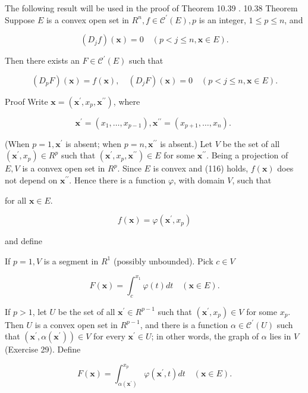 \documentclass[10pt]{article}
\begin{document}
The following result will be used in the proof of Theorem 10.39 . 10.38 Theorem Suppose $E$ is a convex open set in $R^{n}, f \in \mathscr{C}^{\prime}(E), p$ is an integer, $1 \leq p \leq n$, and

$$
\left(D_{j} f\right)(\mathbf{x})=0 \quad(p<j \leq n, \mathbf{x} \in E) .
$$

Then there exists an $F \in \mathscr{C}^{\prime}(E)$ such that

$$
\left(D_{p} F\right)(\mathbf{x})=f(\mathbf{x}), \quad\left(D_{j} F\right)(\mathbf{x})=0 \quad(p<j \leq n, \mathbf{x} \in E) .
$$

Proof Write $\mathbf{x}=\left(\mathbf{x}^{\prime}, x_{p}, \mathbf{x}^{\prime \prime}\right)$, where

$$
\mathbf{x}^{\prime}=\left(x_{1}, \ldots, x_{p-1}\right), \mathbf{x}^{\prime \prime}=\left(x_{p+1}, \ldots, x_{n}\right) \text {. }
$$

(When $p=1, \mathbf{x}^{\prime}$ is absent; when $p=n, \mathbf{x}^{\prime \prime}$ is absent.) Let $V$ be the set of all $\left(\mathbf{x}^{\prime}, x_{p}\right) \in R^{p}$ such that $\left(\mathbf{x}^{\prime}, x_{p}, \mathbf{x}^{\prime \prime}\right) \in E$ for some $\mathbf{x}^{\prime \prime}$. Being a projection of $E, V$ is a convex open set in $R^{p}$. Since $E$ is convex and (116) holds, $f(\mathbf{x})$ does not depend on $\mathbf{x}^{\prime \prime}$. Hence there is a function $\varphi$, with domain $V$, such that

for all $\mathbf{x} \in E$.

$$
f(\mathbf{x})=\varphi\left(\mathbf{x}^{\prime}, x_{p}\right)
$$

and define

If $p=1, V$ is a segment in $R^{1}$ (possibly unbounded). Pick $c \in V$

$$
F(\mathbf{x})=\int_{c}^{x_{1}} \varphi(t) d t \quad(\mathbf{x} \in E) .
$$

If $p>1$, let $U$ be the set of all $\mathbf{x}^{\prime} \in R^{p-1}$ such that $\left(\mathbf{x}^{\prime}, x_{p}\right) \in V$ for some $x_{p}$. Then $U$ is a convex open set in $R^{p-1}$, and there is a function $\alpha \in \mathscr{C}^{\prime}(U)$ such that $\left(\mathbf{x}^{\prime}, \alpha\left(\mathbf{x}^{\prime}\right)\right) \in V$ for every $\mathbf{x}^{\prime} \in U$; in other words, the graph of $\alpha$ lies in $V$ (Exercise 29). Define

$$
F(\mathbf{x})=\int_{\alpha\left(\mathbf{x}^{\prime}\right)}^{x_{p}} \varphi\left(\mathbf{x}^{\prime}, t\right) d t \quad(\mathbf{x} \in E) .
$$
\end{document}
